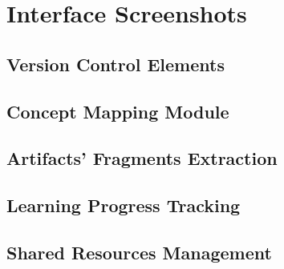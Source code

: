 \chapter{Interface Screenshots \label{cha:appscreen}}

\section{Version Control Elements}

\section{Concept Mapping Module}

\section{Artifacts' Fragments Extraction}

\section{Learning Progress Tracking}

\section{Shared Resources Management}